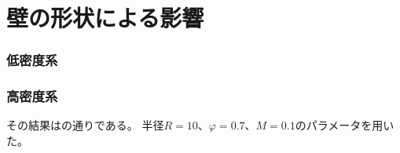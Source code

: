 \documentclass[/Users/ikedahajime/GitHub/reserch/master_report/thesis]{subfiles}
\begin{document}
\section{壁の形状による影響}\label{sec:res_abp_twowall}
\subsubsection{低密度系}
\subsubsection{高密度系}


その結果はの通りである。
半径$R=10$、$\varphi=0.7、M=0.1$のパラメータを用いた。
\end{document}
